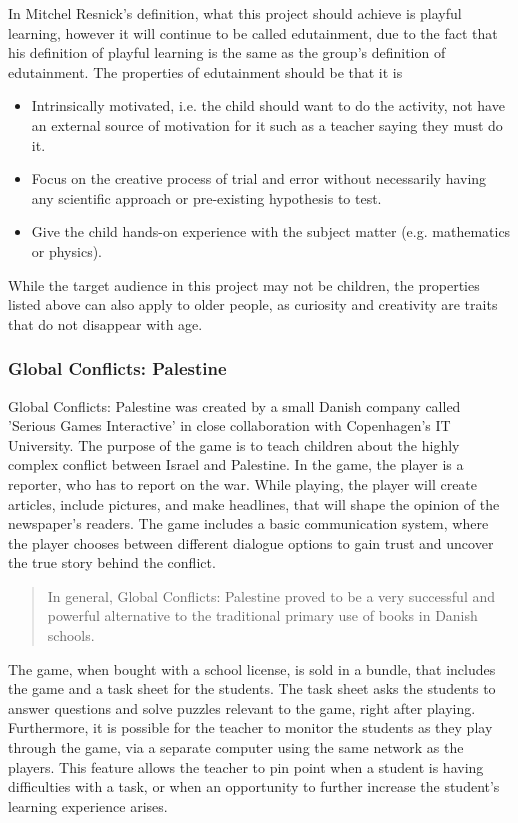 In Mitchel Resnick's definition, what this project should achieve is playful learning, however it will continue to be called edutainment, due to the fact that his definition of playful learning is the same as the group's definition of edutainment. The properties of edutainment should be that it is

\begin{itemize}
\item Intrinsically motivated, i.e. the child should want to do the activity, not have an external source of motivation for it such as a teacher saying they must do it.
\item Focus on the creative process of trial and error without necessarily having any scientific approach or pre-existing hypothesis to test.
\item Give the child hands-on experience with the subject matter (e.g. mathematics or physics).
\end{itemize}

While the target audience in this project  may not be children, the properties listed above can also apply to older people, as curiosity and creativity are traits that do not disappear with age.

\subsubsection{Global Conflicts: Palestine}

Global Conflicts: Palestine was created by a small Danish company called 'Serious Games Interactive' in close collaboration with Copenhagen's IT University.
The purpose of the game is to teach children about the highly complex conflict between Israel and Palestine.
In the game, the player is a reporter, who has to report on the war.
While playing, the player will create articles, include pictures, and make headlines, that will shape the opinion of the newspaper's readers.
The game includes a basic communication system, where the player chooses between different dialogue options to gain trust and uncover the true story behind the conflict. 
\begin{quote}
	In general, Global Conflicts: Palestine proved to be a very successful and powerful alternative to the traditional primary use of books in Danish schools.\cite{laeringpaaspil}
\end{quote}
The game, when bought with a school license, is sold in a bundle, that includes the game and a task sheet for the students.
The task sheet asks the students to answer questions and solve puzzles relevant to the game, right after playing.
Furthermore, it is possible for the teacher to monitor the students as they play through the game, via a separate computer using the same network as the players.
This feature allows the teacher to pin point when a student is having difficulties with a task, or when an opportunity to further increase the student's learning experience arises.\newline

